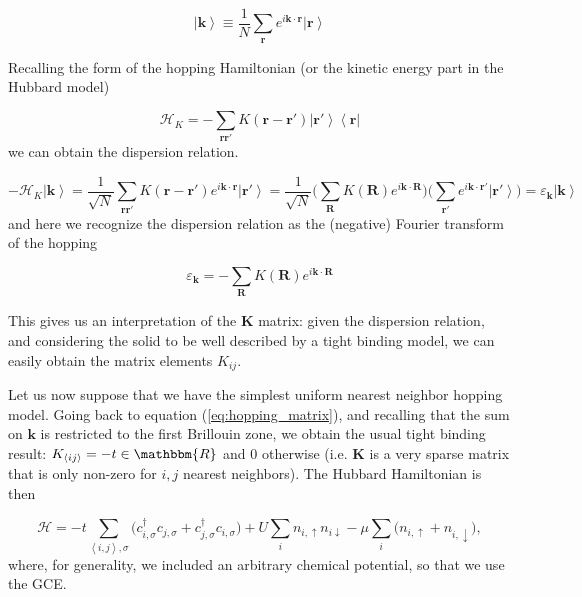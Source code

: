 \begin{equation}
\left| \bm k \right\rangle \equiv \frac{1}{N} \sum_{\bm r} e^{i\bm k \cdot \bm r} \left| \bm r \right\rangle
\end{equation}

Recalling the form of the hopping Hamiltonian (or the kinetic energy part in the Hubbard model)

\begin{equation}
\mathcal{H}_{K} = - \sum_{\bm r \bm r'} K (\bm r - \bm r') \left| \bm r' \right\rangle \left\langle \bm r \right|
\end{equation}
we can obtain the dispersion relation.

\begin{equation}
- \mathcal{H}_{K} \left| \bm k \right\rangle = \frac{1}{\sqrt{N}} \sum_{\bm r \bm r'} K ( \bm r - \bm r' ) e^{i \bm k \cdot \bm r} \left| \bm r' \right \rangle = \frac{1}{\sqrt{N}} \bigg( \sum_{\bm R} K(\bm R) e^{i\bm k \cdot \bm R} \bigg) \bigg( \sum_{\bm r'} e^{i\bm k \cdot \bm r'} \left| \bm r' \right\rangle \bigg) = \varepsilon_{\bm k} \left| \bm k \right\rangle
\end{equation}
and here we recognize the dispersion relation as the (negative) Fourier transform of the hopping

\begin{equation}
\varepsilon_{\bm k} = - \sum_{\bm R} K(\bm R) e^{i\bm k \cdot \bm R} 
\end{equation}

This gives us an interpretation of the $\bm K$ matrix: given the dispersion relation, and considering the solid to be well described by a tight binding model, we can easily obtain the matrix elements $K_{i j}$.

Let us now suppose that we have the simplest uniform nearest neighbor hopping model.
Going back to equation (\ref{eq:hopping_matrix}), and recalling that the sum on $\bm k$ is restricted to the first Brillouin zone, we obtain the usual tight binding result: $K_{\left\langle i j \right\rangle} = - t \in \mathbbm{R}$ and $0$ otherwise (i.e. $\bm K$ is a very sparse matrix that is only non-zero for $i, j$ nearest neighbors).
The Hubbard Hamiltonian is then

\begin{equation}\label{eq:hubbard_hamiltonian}
\mathcal{H} = - t \sum_{\left\langle i, j \right\rangle, \sigma} \bigg(c_{i,\sigma}^\dagger c_{j,\sigma} + c_{j,\sigma}^\dagger c_{i,\sigma} \bigg) + U \sum_{i} n_{i,\uparrow} n_{i\downarrow} -\mu \sum_i \bigg( n_{i,\uparrow} + n_{i,\downarrow} \bigg) ,
\end{equation}
where, for generality, we included an arbitrary chemical potential, so that we use the \ac{GCE}.

